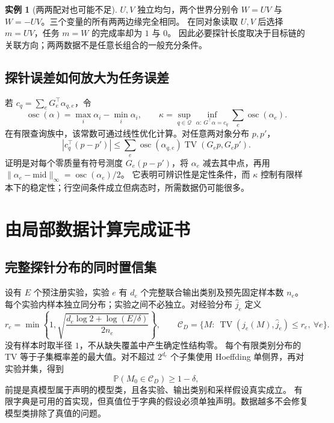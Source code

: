 \documentclass[11pt,a4paper,fontset=fandol]{ctexart}
\theoremstyle{definition}
\newtheorem{example}[theorem]{实例}
\theoremstyle{remark}
\numberwithin{equation}{section}
\newcommand{\Pp}{\mathbb P}
\newcommand{\TV}{\operatorname{TV}}
\begin{document}
\begin{example}[两两配对也可能不足]
$U,V$ 独立均匀，两个世界分别令 $W=UV$ 与 $W=-UV$。三个变量的所有两两边缘完全相同。
在同对象读取 $U,V$ 后选择 $m=UV$，任务 $m=W$ 的完成率却为 $1$ 与 $0$。
因此必要探针长度取决于目标链的关联方向；两两数据不是任意长组合的一般充分条件。
\end{example}

\subsection{探针误差如何放大为任务误差}
若 $c_q=\sum_eG_e^\top\alpha_{q,e}$，令
\[
 \operatorname{osc}(\alpha)=\max_i\alpha_i-\min_i\alpha_i,\qquad
 \kappa=\sup_{q\in\mathcal Q}\inf_{\alpha:\,G^\top\alpha=c_q}
 \sum_e\operatorname{osc}(\alpha_e).
\]
在有限查询族中，该常数可通过线性优化计算。对任意两对象分布 $p,p'$，
\begin{equation}
 |c_q^\top(p-p')|
 \le\sum_e\operatorname{osc}(\alpha_{q,e})
          \TV(G_ep,G_ep').
 \label{eq:transfer}
\end{equation}
证明是对每个零质量有符号测度 $G_e(p-p')$，将 $\alpha_e$ 减去其中点，再用
$\|\alpha_e-\mathrm{mid}\|_\infty=\operatorname{osc}(\alpha_e)/2$。
它表明可辨识性是定性条件，而 $\kappa$ 控制有限样本下的稳定性；行空间条件成立但病态时，所需数据仍可能很多。

\section{由局部数据计算完成证书}
\label{sec:certificate}
\subsection{完整探针分布的同时置信集}
设有 $E$ 个预注册实验，实验 $e$ 有 $d_e$ 个完整联合输出类别及预先固定样本数 $n_e$。
每个实验内样本独立同分布；实验之间不必独立。对经验分布 $\widehat j_e$ 定义
\begin{equation}
 r_e=\min\left\{1,\sqrt{\frac{d_e\log2+\log(E/\delta)}{2n_e}}\right\},
 \qquad
 \mathcal C_D=\{M:\ \TV(j_e(M),\widehat j_e)\le r_e,\ \forall e\}.
 \label{eq:confidence}
\end{equation}
没有样本时取半径 $1$，不从缺失覆盖中产生确定性结构零。
每个有限类别分布的 TV 等于子集概率差的最大值。对不超过 $2^{d_e}$ 个子集使用 Hoeffding 单侧界，再对实验并集，得到
\begin{equation}
 \Pp(M_0\in\mathcal C_D)\ge1-\delta,
 \label{eq:coverage}
\end{equation}
前提是真模型属于声明的模型类，且各实验、输出类别和采样假设真实成立。
有限字典是可用的首实现，但真值位于字典的假设必须单独声明。数据越多不会修复模型类排除了真值的问题。
\end{document}
